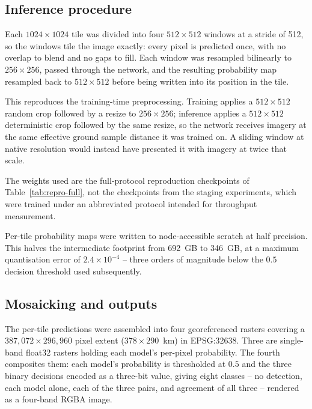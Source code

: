 \subsection{Inference procedure}
\label{sec:disc-procedure}

Each $1024\times1024$ tile was divided into four $512\times512$ windows at a
stride of 512, so the windows tile the image exactly: every pixel is predicted
once, with no overlap to blend and no gaps to fill. Each window was resampled
bilinearly to $256\times256$, passed through the network, and the resulting
probability map resampled back to $512\times512$ before being written into its
position in the tile.

This reproduces the training-time preprocessing. Training applies a
$512\times512$ random crop followed by a resize to $256\times256$; inference
applies a $512\times512$ deterministic crop followed by the same resize, so the
network receives imagery at the same effective ground sample distance it was
trained on. A sliding window at native resolution would instead have presented
it with imagery at twice that scale.

The weights used are the full-protocol reproduction checkpoints of
Table~\ref{tab:repro-full}, not the checkpoints from the \pads{} staging
experiments, which were trained under an abbreviated protocol intended for
throughput measurement.

Per-tile probability maps were written to node-accessible scratch at half
precision. This halves the intermediate footprint from 692~GB to 346~GB, at a
maximum quantisation error of $2.4\times10^{-4}$ -- three orders of magnitude
below the $0.5$ decision threshold used subsequently.

\subsection{Mosaicking and outputs}
\label{sec:disc-outputs}

The per-tile predictions were assembled into four georeferenced rasters
covering a $387{,}072\times296{,}960$ pixel extent ($378\times290$~km) in
EPSG:32638. Three are single-band float32 rasters holding each model's
per-pixel probability. The fourth composites them: each model's probability is
thresholded at $0.5$ and the three binary decisions encoded as a three-bit
value, giving eight classes -- no detection, each model alone, each of the three
pairs, and agreement of all three -- rendered as a four-band RGBA image.

